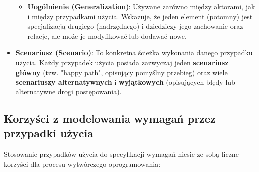 \documentclass[a4paper,12pt]{article}
\begin{document}
\begin{itemize}
\begin{itemize}
        \item \textbf{Uogólnienie (Generalization)}: Używane zarówno między aktorami, jak i między przypadkami użycia. Wskazuje, że jeden element (potomny) jest specjalizacją drugiego (nadrzędnego) i dziedziczy jego zachowanie oraz relacje, ale może je modyfikować lub dodawać nowe.
    \end{itemize}

    \item \textbf{Scenariusz (Scenario)}: To konkretna ścieżka wykonania danego przypadku użycia. Każdy przypadek użycia posiada zazwyczaj jeden \textbf{scenariusz główny} (tzw. "happy path", opisujący pomyślny przebieg) oraz wiele \textbf{scenariuszy alternatywnych} i \textbf{wyjątkowych} (opisujących błędy lub alternatywne drogi postępowania).
\end{itemize}

\subsection{Korzyści z modelowania wymagań przez przypadki użycia}

Stosowanie przypadków użycia do specyfikacji wymagań niesie ze sobą liczne korzyści dla procesu wytwórczego oprogramowania:
\end{document}
